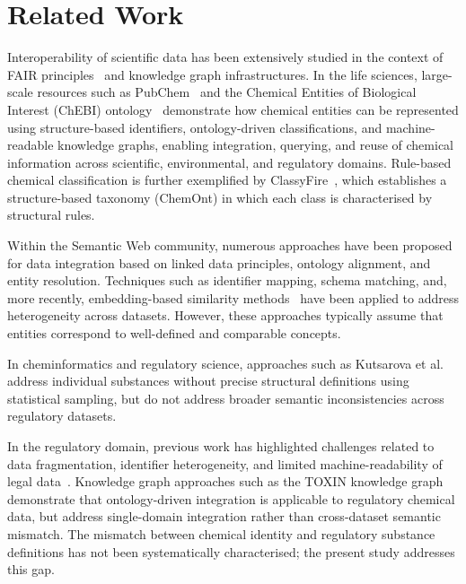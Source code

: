 \section{Related Work}
\label{sec:related_work}

Interoperability of scientific data has been extensively studied in the context of FAIR principles~\cite{Wilkinson2016} and knowledge graph infrastructures. In the life sciences, large-scale resources such as PubChem~\cite{Kim2015} and the Chemical Entities of Biological Interest (ChEBI) ontology~\cite{Degtyarenko2008} demonstrate how chemical entities can be represented using structure-based identifiers, ontology-driven classifications, and machine-readable knowledge graphs, enabling integration, querying, and reuse of chemical information across scientific, environmental, and regulatory domains. Rule-based chemical classification is further exemplified by ClassyFire~\cite{DjoumbouFeunang2016}, which establishes a structure-based taxonomy (ChemOnt) in which each class is characterised by structural rules.

Within the Semantic Web community, numerous approaches have been proposed for data integration based on linked data principles, ontology alignment, and entity resolution. Techniques such as identifier mapping, schema matching, and, more recently, embedding-based similarity methods~\cite{Reimers2019} have been applied to address heterogeneity across datasets. However, these approaches typically assume that entities correspond to well-defined and comparable concepts.

In cheminformatics and regulatory science, approaches such as Kutsarova et al.~\cite{Kutsarova2019} address individual substances without precise structural definitions using statistical sampling, but do not address broader semantic inconsistencies across regulatory datasets.

 In the regulatory domain, previous work has highlighted challenges related to data fragmentation, identifier heterogeneity, and limited machine-readability of legal data~\cite{Filtz2021}. Knowledge graph approaches such as the TOXIN knowledge graph~\cite{Sepehri2025TOXIN} demonstrate that ontology-driven integration is applicable to regulatory chemical data, but address single-domain integration rather than cross-dataset semantic mismatch. The mismatch between chemical identity and regulatory substance definitions has not been systematically characterised; the present study addresses this gap.







 